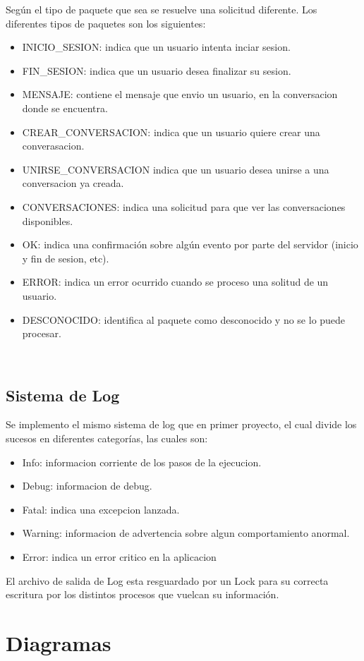 \documentclass[a4paper,12pt,titlepage]{article}
\begin{document}
Según el tipo de paquete que sea se resuelve una solicitud diferente. Los diferentes tipos de paquetes son los siguientes:
\begin{itemize}
\item INICIO\_SESION: indica que un usuario intenta inciar sesion.
\item FIN\_SESION: indica que un usuario desea finalizar su sesion.
\item MENSAJE: contiene el mensaje que envio un usuario, en la conversacion donde se encuentra.
\item CREAR\_CONVERSACION: indica que un usuario quiere crear una converasacion.
\item UNIRSE\_CONVERSACION indica que un usuario desea unirse a una conversacion ya creada.
\item CONVERSACIONES: indica una solicitud para que ver las conversaciones disponibles.
\item OK: indica una confirmación sobre algún evento por parte del servidor (inicio y fin de sesion, etc).
\item ERROR: indica un error ocurrido cuando se proceso una solitud de un usuario.
\item DESCONOCIDO: identifica al paquete como desconocido y no se lo puede procesar.
\end{itemize}\\

\subsection{Sistema de Log}

Se implemento el mismo sistema de log que en primer proyecto, el cual divide los sucesos en diferentes categorías, las cuales son:
\begin{itemize}
\item Info: informacion corriente de los pasos de la ejecucion.
\item Debug: informacion de debug.
\item Fatal: indica una excepcion lanzada.
\item Warning: informacion de advertencia sobre algun comportamiento anormal.
\item Error: indica un error critico en la aplicacion
\end{itemize}
El archivo de salida de Log esta resguardado por un Lock para su correcta escritura por los distintos procesos que vuelcan su información.

\newpage
\section{Diagramas}
\end{document}
